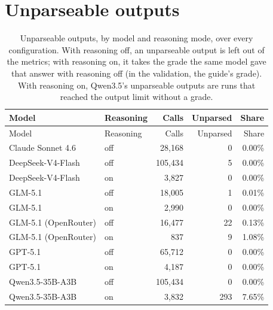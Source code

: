\documentclass[10pt]{article}
\begin{document}
\section{Unparseable outputs}
\begingroup\footnotesize
\begin{longtable}{llrrr}
\caption{Unparseable outputs, by model and reasoning mode, over every configuration. With reasoning off, an unparseable output is left out of the metrics; with reasoning on, it takes the grade the same model gave that answer with reasoning off (in the validation, the guide's grade). With reasoning on, Qwen3.5's unparseable outputs are runs that reached the output limit without a grade.}\\
\hline
Model & Reasoning & Calls & Unparsed & Share \\ \hline
\endfirsthead
\hline
Model & Reasoning & Calls & Unparsed & Share \\ \hline
\endhead
Claude Sonnet 4.6 & off & 28,168 & 0 & 0.00\% \\
DeepSeek-V4-Flash & off & 105,434 & 5 & 0.00\% \\
DeepSeek-V4-Flash & on & 3,827 & 0 & 0.00\% \\
GLM-5.1 & off & 18,005 & 1 & 0.01\% \\
GLM-5.1 & on & 2,990 & 0 & 0.00\% \\
GLM-5.1 (OpenRouter) & off & 16,477 & 22 & 0.13\% \\
GLM-5.1 (OpenRouter) & on & 837 & 9 & 1.08\% \\
GPT-5.1 & off & 65,712 & 0 & 0.00\% \\
GPT-5.1 & on & 4,187 & 0 & 0.00\% \\
Qwen3.5-35B-A3B & off & 105,434 & 0 & 0.00\% \\
Qwen3.5-35B-A3B & on & 3,832 & 293 & 7.65\% \\
\hline
\end{longtable}
\endgroup
\end{document}
